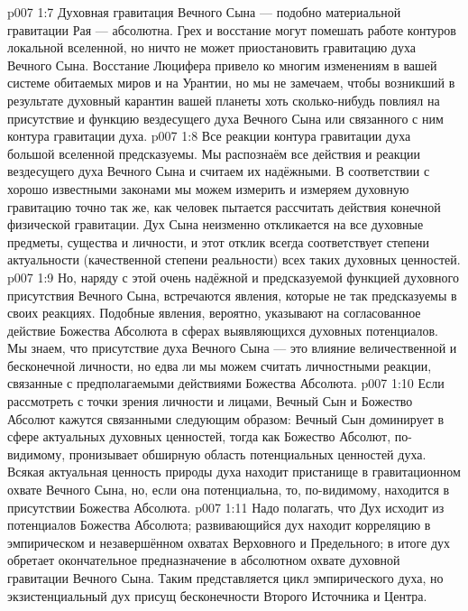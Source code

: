 \vs p007 1:7 \pc Духовная гравитация Вечного Сына --- подобно материальной гравитации Рая --- абсолютна. Грех и восстание могут помешать работе контуров локальной вселенной, но ничто не может приостановить гравитацию духа Вечного Сына. Восстание Люцифера привело ко многим изменениям в вашей системе обитаемых миров и на Урантии, но мы не замечаем, чтобы возникший в результате духовный карантин вашей планеты хоть сколько\hyp{}нибудь повлиял на присутствие и функцию вездесущего духа Вечного Сына или связанного с ним контура гравитации духа.
\vs p007 1:8 \pc Все реакции контура гравитации духа большой вселенной предсказуемы. Мы распознаём все действия и реакции вездесущего духа Вечного Сына и считаем их надёжными. В соответствии с хорошо известными законами мы можем измерить и измеряем духовную гравитацию точно так же, как человек пытается рассчитать действия конечной физической гравитации. Дух Сына неизменно откликается на все духовные предметы, существа и личности, и этот отклик всегда соответствует степени актуальности (качественной степени реальности) всех таких духовных ценностей.
\vs p007 1:9 Но, наряду с этой очень надёжной и предсказуемой функцией духовного присутствия Вечного Сына, встречаются явления, которые не так предсказуемы в своих реакциях. Подобные явления, вероятно, указывают на согласованное действие Божества Абсолюта в сферах выявляющихся духовных потенциалов. Мы знаем, что присутствие духа Вечного Сына --- это влияние величественной и бесконечной личности, но едва ли мы можем считать личностными реакции, связанные с предполагаемыми действиями Божества Абсолюта.
\vs p007 1:10 \pc Если рассмотреть с точки зрения личности и лицами, Вечный Сын и Божество Абсолют кажутся связанными следующим образом: Вечный Сын доминирует в сфере актуальных духовных ценностей, тогда как Божество Абсолют, по\hyp{}видимому, пронизывает обширную область потенциальных ценностей духа. Всякая актуальная ценность природы духа находит пристанище в гравитационном охвате Вечного Сына, но, если она потенциальна, то, по\hyp{}видимому, находится в присутствии Божества Абсолюта.
\vs p007 1:11 Надо полагать, что Дух исходит из потенциалов Божества Абсолюта; развивающийся дух находит корреляцию в эмпирическом и незавершённом охватах Верховного и Предельного; в итоге дух обретает окончательное предназначение в абсолютном охвате духовной гравитации Вечного Сына. Таким представляется цикл эмпирического духа, но экзистенциальный дух присущ бесконечности Второго Источника и Центра.
